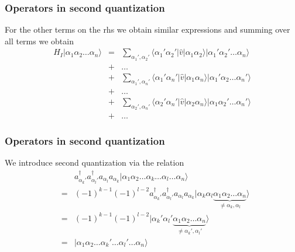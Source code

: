 \documentclass{beamer}
\begin{document}
\begin{frame}
\frametitle{Operators in second quantization}

\begin{block}{}
For the other terms on the rhs we obtain similar expressions  and summing over all terms we obtain
\begin{eqnarray}
	H_I |\alpha_1\alpha_2\dots\alpha_n\rangle &=& \sum_{\alpha_1', \alpha_2'} \langle \alpha_1'\alpha_2'|\hat{v}|\alpha_1\alpha_2\rangle
		|\alpha_1'\alpha_2'\dots\alpha_n\rangle \nonumber \\
	&+& \dots \nonumber \\
	&+& \sum_{\alpha_1', \alpha_n'} \langle \alpha_1'\alpha_n'|\hat{v}|\alpha_1\alpha_n\rangle
		|\alpha_1'\alpha_2\dots\alpha_n'\rangle \nonumber \\
	&+& \dots \nonumber \\
	&+& \sum_{\alpha_2', \alpha_n'} \langle \alpha_2'\alpha_n'|\hat{v}|\alpha_2\alpha_n\rangle
		|\alpha_1\alpha_2'\dots\alpha_n'\rangle \nonumber \\
	 &+& \dots \label{eq:2-34}
\end{eqnarray}
\end{block}
\end{frame}

\begin{frame}
\frametitle{Operators in second quantization}

\begin{block}{}
We introduce second quantization via the relation
\begin{eqnarray}
	&& a_{\alpha_k'}^{\dagger} a_{\alpha_l'}^{\dagger} a_{\alpha_l} a_{\alpha_k} 
		|\alpha_1\alpha_2\dots\alpha_k\dots\alpha_l\dots\alpha_n\rangle \nonumber \\
	&=& (-1)^{k-1} (-1)^{l-2} a_{\alpha_k'}^{\dagger} a_{\alpha_l'}^{\dagger} a_{\alpha_l} a_{\alpha_k}
		|\alpha_k\alpha_l \underbrace{\alpha_1\alpha_2\dots\alpha_n}_{\neq \alpha_k,\alpha_l}\rangle \nonumber \\
	&=& (-1)^{k-1} (-1)^{l-2} 
	|\alpha_k'\alpha_l' \underbrace{\alpha_1\alpha_2\dots\alpha_n}_{\neq \alpha_k',\alpha_l'}\rangle \nonumber \\
	&=& |\alpha_1\alpha_2\dots\alpha_k'\dots\alpha_l'\dots\alpha_n\rangle \label{eq:2-35}
\end{eqnarray}
\end{block}
\end{frame}
\end{document}
